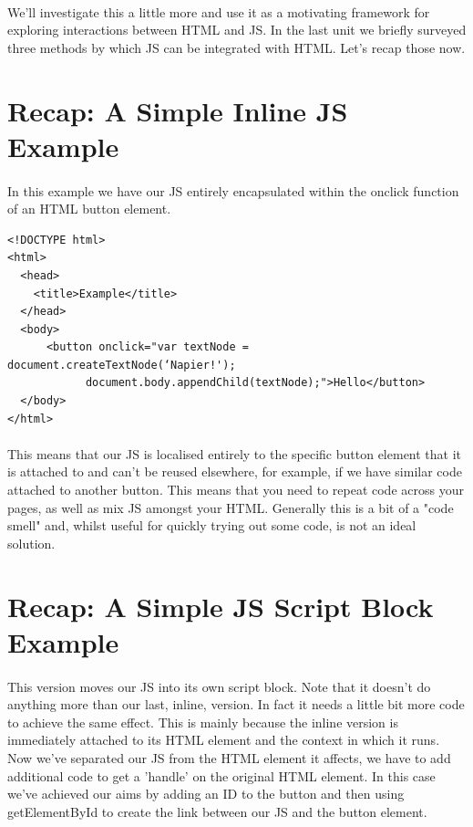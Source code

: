 \paragraph{} We’ll investigate this a little more and use it as a motivating framework for exploring interactions between HTML and JS. In the last unit we briefly surveyed three methods by which JS can be integrated with HTML. Let's recap those now.


\section{Recap: A Simple Inline JS Example}
\paragraph{} In this example we have our JS entirely encapsulated within the onclick function of an HTML button element.

\begin{lstlisting}
<!DOCTYPE html>
<html>
  <head>
    <title>Example</title>
  </head>
  <body>
      <button onclick="var textNode = document.createTextNode(‘Napier!');
 			document.body.appendChild(textNode);">Hello</button>
  </body>
</html>
\end{lstlisting}

\paragraph{} This means that our JS is localised entirely to the specific button element that it is attached to and can't be reused elsewhere, for example, if we have similar code attached to another button. This means that you need to repeat code across your pages, as well as mix JS amongst your HTML. Generally this is a bit of a "code smell" and, whilst useful for quickly trying out some code, is not an ideal solution.


\section{Recap: A Simple JS Script Block Example}
\paragraph{} This version moves our JS into its own script block. Note that it doesn't do anything more than our last, inline, version. In fact it needs a little bit more code to achieve the same effect. This is mainly because the inline version is immediately attached to its HTML element and the context in which it runs. Now we've separated our JS from the HTML element it affects, we have to add additional code to get a 'handle' on the original HTML element. In this case we've achieved our aims by adding an ID to the button and then using getElementById to create the link between our JS and the button element.

